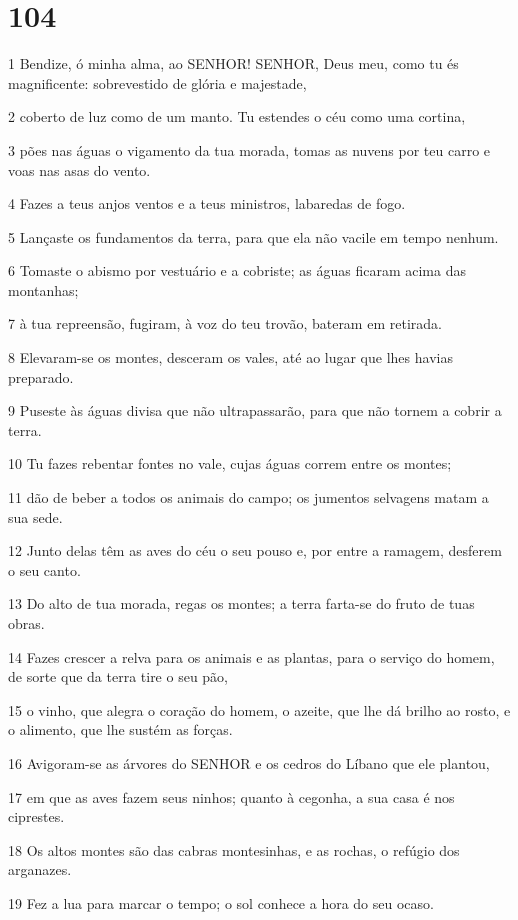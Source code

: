 \chapter{104}

\par 1 Bendize, ó minha alma, ao SENHOR! SENHOR, Deus meu, como tu és magnificente: sobrevestido de glória e majestade,
\par 2 coberto de luz como de um manto. Tu estendes o céu como uma cortina,
\par 3 pões nas águas o vigamento da tua morada, tomas as nuvens por teu carro e voas nas asas do vento.
\par 4 Fazes a teus anjos ventos e a teus ministros, labaredas de fogo.
\par 5 Lançaste os fundamentos da terra, para que ela não vacile em tempo nenhum.
\par 6 Tomaste o abismo por vestuário e a cobriste; as águas ficaram acima das montanhas;
\par 7 à tua repreensão, fugiram, à voz do teu trovão, bateram em retirada.
\par 8 Elevaram-se os montes, desceram os vales, até ao lugar que lhes havias preparado.
\par 9 Puseste às águas divisa que não ultrapassarão, para que não tornem a cobrir a terra.
\par 10 Tu fazes rebentar fontes no vale, cujas águas correm entre os montes;
\par 11 dão de beber a todos os animais do campo; os jumentos selvagens matam a sua sede.
\par 12 Junto delas têm as aves do céu o seu pouso e, por entre a ramagem, desferem o seu canto.
\par 13 Do alto de tua morada, regas os montes; a terra farta-se do fruto de tuas obras.
\par 14 Fazes crescer a relva para os animais e as plantas, para o serviço do homem, de sorte que da terra tire o seu pão,
\par 15 o vinho, que alegra o coração do homem, o azeite, que lhe dá brilho ao rosto, e o alimento, que lhe sustém as forças.
\par 16 Avigoram-se as árvores do SENHOR e os cedros do Líbano que ele plantou,
\par 17 em que as aves fazem seus ninhos; quanto à cegonha, a sua casa é nos ciprestes.
\par 18 Os altos montes são das cabras montesinhas, e as rochas, o refúgio dos arganazes.
\par 19 Fez a lua para marcar o tempo; o sol conhece a hora do seu ocaso.
